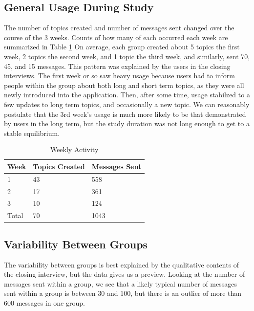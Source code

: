   \subsection{General Usage During Study}
    The number of topics created and number of messages sent changed over
    the course of the 3 weeks.
    Counts of how many of each occurred each week are summarized in
    Table \ref{table:weekly}
    On average, each group created about 5 topics the first week,
    2 topics the second week, and 1 topic the third week,
    and similarly, sent 70, 45, and 15 messages.
    This pattern was explained by the users in the closing interviews.
    The first week or so saw heavy usage because users had to inform
    people within the group about both long and short term topics,
    as they were all newly introduced into the application.
    Then, after some time, usage stabilzed to a few updates to long term topics,
    and occasionally a new topic.
    We can reasonably postulate that the 3rd week's usage is much more likely
    to be that demonstrated by users in the long term,
    but the study duration was not long enough to get to a stable equilibrium.

    \begin{table}[h]
    \centering
    \caption{Weekly Activity}
    \label{table:weekly}
    \begin{tabular}{ l l l}
    Week & Topics Created & Messages Sent \\
    \hline
    1 & 43 & 558      \\[5pt]
    2 & 17 & 361      \\[5pt]
    3 & 10 & 124      \\[5pt]
    \hline
    Total & 70 & 1043       \\[5pt]
    \end{tabular}
    \end{table}

  \subsection{Variability Between Groups}
    The variability between groups is best explained by the
    qualitative contents of the closing interview,
    but the data gives us a preview.
    Looking at the number of messages sent within a group,
    we see that a likely typical number of messages sent within a group
    is between 30 and 100,
    but there is an outlier of more than 600 messages in one group.


